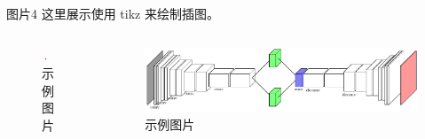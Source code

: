 \documentclass[aspectratio=169]{beamer}
\begin{document}
\begin{frame}{图片4}
    这里展示使用 tikz 来绘制插图。\\
    \begin{columns}[t]  %
        \begin{column}{0.3\textwidth}
            \begin{figure}[!ht]
                \centering
                \includegraphics[width=0.4\textwidth]{tikz/pic1.pdf}
                \caption{示例图片}
                \label{fig:pic1}
            \end{figure}
        \end{column}
        \begin{column}{0.7\textwidth}
            \begin{figure}[!ht]
                \centering
                \includegraphics[width=\textwidth]{tikz/net.pdf}
                \caption{示例图片}
                \label{fig:net}
            \end{figure}
        \end{column}
    \end{columns}
\end{frame}
\end{document}
